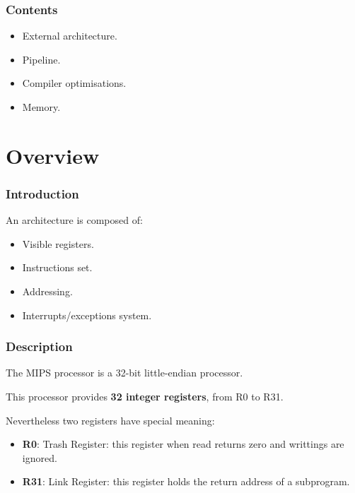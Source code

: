 
\begin{frame}
  \frametitle{Contents}

  \begin{itemize}[<+->]
    \item
      External architecture.
    \item
      Pipeline.
    \item
      Compiler optimisations.
    \item
      Memory.
  \end{itemize}
\end{frame}

%
%

\section{Overview}


\begin{frame}
  \frametitle{Introduction}

  An architecture is composed of:

  \begin{itemize}[<+->]
    \item
      Visible registers.
    \item
      Instructions set.
    \item
      Addressing.
    \item
      Interrupts/exceptions system.
  \end{itemize}
\end{frame}


\begin{frame}
  \frametitle{Description}

  The MIPS processor is a 32-bit little-endian processor.

  \nl

  This processor provides \textbf{32 integer registers}, from R0 to R31.

  \nl

  Nevertheless two registers have special meaning:

  \begin{itemize}[<+->]
    \item
      \textbf{R0}: Trash Register: this register when read returns zero and
      writtings are ignored.
    \item
      \textbf{R31}: Link Register: this register holds the return address
      of a subprogram.
  \end{itemize}
\end{frame}

